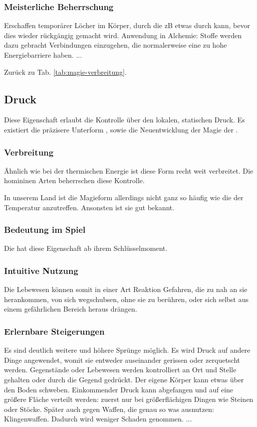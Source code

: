 \subsubsection{Meisterliche Beherrschung} 
\begin{outline}
	\1 Erschaffen temporärer Löcher im Körper, durch die zB etwas durch kann, bevor dies wieder rückgängig gemacht wird.
	\1 Anwendung in Alchemie: Stoffe werden dazu gebracht Verbindungen einzugehen, die normalerweise eine zu hohe Energiebarriere haben.
	\1 ...
\end{outline}
Zurück zu Tab. \ref{tab:magie-verbreitung}.



\subsection{Druck}\label{magie:druck}
Diese Eigenschaft erlaubt die Kontrolle über den lokalen, statischen Druck. 
Es existiert die präzisere Unterform , sowie die Neuentwicklung der Magie der .

\subsubsection{Verbreitung}
Ähnlich wie bei der thermischen Energie ist diese Form recht weit verbreitet. 
Die homininen Arten beherrschen diese Kontrolle. 

In unserem Land ist die Magieform allerdings nicht ganz so häufig wie die der Temperatur anzutreffen. 
Ansonsten ist sie gut bekannt.

\subsubsection{Bedeutung im Spiel}
Die  hat diese Eigenschaft ab ihrem Schlüsselmoment. %

\subsubsection{Intuitive Nutzung}
Die Lebewesen können somit in einer Art Reaktion Gefahren, die zu nah an sie herankommen, von sich wegschubsen, ohne sie zu berühren, oder sich selbst aus einem gefährlichen Bereich heraus drängen. 

\subsubsection{Erlernbare Steigerungen}
\begin{outline}
	\1 Es sind deutlich weitere und höhere Sprünge möglich.
	\1 Es wird Druck auf andere Dinge angewendet, womit sie entweder auseinander gerissen oder zerquetscht werden.
	\1 Gegenstände oder Lebewesen werden kontrolliert an Ort und Stelle gehalten oder durch die Gegend gedrückt.
	\1 Der eigene Körper kann etwas über den Boden schweben.
	\1 Einkommender Druck kann abgefangen und auf eine größere Fläche verteilt werden: zuerst nur bei größerflächigen Dingen wie Steinen oder Stöcke. 
	Später auch gegen Waffen, die genau so was ausnutzen: Klingenwaffen. 
	Dadurch wird weniger Schaden genommen.
	\1 ...
\end{outline}

